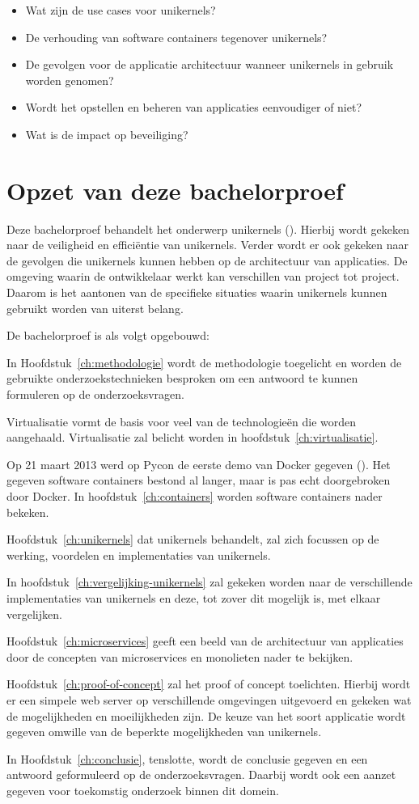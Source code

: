 \begin{itemize}  
\item Wat zijn de use cases voor unikernels?
\item De verhouding van software containers tegenover unikernels?
\item De gevolgen voor de applicatie architectuur wanneer unikernels in gebruik worden genomen?
\item Wordt het opstellen en beheren van applicaties eenvoudiger of niet?
\item Wat is de impact op beveiliging?
\end{itemize}

\section{Opzet van deze bachelorproef}
\label{sec:opzet-bachelorproef}

Deze bachelorproef behandelt het onderwerp unikernels (\cite{mao_performance_2012}). Hierbij wordt gekeken naar de veiligheid en efficiëntie van unikernels. Verder wordt er ook gekeken naar de gevolgen die unikernels kunnen hebben op de architectuur van applicaties. De omgeving waarin de ontwikkelaar werkt kan verschillen van project tot project. Daarom is het aantonen van de specifieke situaties waarin unikernels kunnen gebruikt worden van uiterst belang.

De bachelorproef is als volgt opgebouwd:

In Hoofdstuk~\ref{ch:methodologie} wordt de methodologie toegelicht en worden de gebruikte onderzoekstechnieken besproken om een antwoord te kunnen formuleren op de onderzoeksvragen.

Virtualisatie vormt de basis voor veel van de technologieën die worden aangehaald. Virtualisatie zal belicht worden in hoofdstuk~\ref{ch:virtualisatie}.

Op 21 maart 2013 werd op Pycon de eerste demo van Docker gegeven (\cite{hykes_future_2013}). Het gegeven software containers bestond al langer, maar is pas echt doorgebroken door Docker. In hoofdstuk~\ref{ch:containers} worden software containers nader bekeken.

Hoofdstuk~\ref{ch:unikernels} dat unikernels behandelt, zal zich focussen op de werking, voordelen en implementaties van unikernels.

In hoofdstuk~\ref{ch:vergelijking-unikernels} zal gekeken worden naar de verschillende implementaties van unikernels en deze, tot zover dit mogelijk is, met elkaar vergelijken.

Hoofdstuk~\ref{ch:microservices} geeft een beeld van de architectuur van applicaties door de concepten van microservices en monolieten nader te bekijken.

Hoofdstuk~\ref{ch:proof-of-concept} zal het proof of concept toelichten. Hierbij wordt er een simpele web server op verschillende omgevingen uitgevoerd en gekeken wat de mogelijkheden en moeilijkheden zijn. De keuze van het soort applicatie wordt gegeven omwille van de beperkte mogelijkheden van unikernels.

In Hoofdstuk~\ref{ch:conclusie}, tenslotte, wordt de conclusie gegeven en een antwoord geformuleerd op de onderzoeksvragen. Daarbij wordt ook een aanzet gegeven voor toekomstig onderzoek binnen dit domein.
